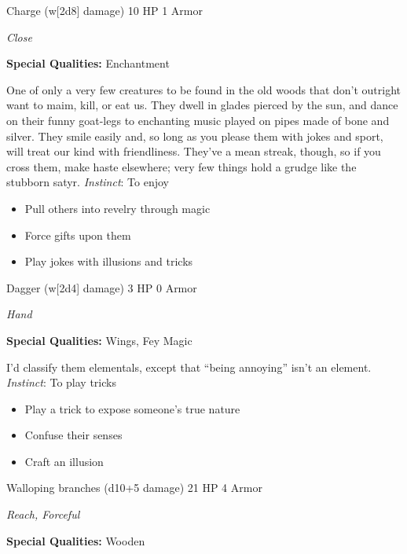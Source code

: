 \HRule
{}

Charge (w[2d8] damage)\hspace*{\fill} 10 HP 1 Armor

\emph{Close}

\textbf{Special Qualities:}
Enchantment

\HRule
One of only a very few creatures to be found in the old woods that don't outright want to maim, kill, or eat us. They dwell in glades pierced by the sun, and dance on their funny goat-legs to enchanting music played on pipes made of bone and silver. They smile easily and, so long as you please them with jokes and sport, will treat our kind with friendliness. They've a mean streak, though, so if you cross them, make haste elsewhere; very few things hold a grudge like the stubborn satyr. \emph{Instinct}: To enjoy
\begin{itemize}
\item Pull others into revelry through magic
\item Force gifts upon them
\item Play jokes with illusions and tricks
\end{itemize}
\newpage
\HRule
{}

Dagger (w[2d4] damage)\hspace*{\fill} 3 HP 0 Armor

\emph{Hand}

\textbf{Special Qualities:}
Wings, Fey Magic

\HRule
I'd classify them elementals, except that ``being annoying'' isn't an element. \emph{Instinct}: To play tricks
\begin{itemize}
\item Play a trick to expose someone's true nature
\item Confuse their senses
\item Craft an illusion
\end{itemize}

\HRule
{}

Walloping branches (d10+5 damage)\hspace*{\fill} 21 HP 4 Armor

\emph{Reach, Forceful}

\textbf{Special Qualities:}
Wooden

